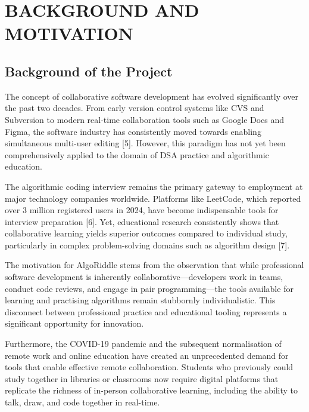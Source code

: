 \chapter{BACKGROUND AND MOTIVATION}

\section{Background of the Project}

The concept of collaborative software development has evolved significantly over the past two decades. From early version control systems like CVS and Subversion to modern real-time collaboration tools such as Google Docs and Figma, the software industry has consistently moved towards enabling simultaneous multi-user editing [5]. However, this paradigm has not yet been comprehensively applied to the domain of DSA practice and algorithmic education.

The algorithmic coding interview remains the primary gateway to employment at major technology companies worldwide. Platforms like LeetCode, which reported over 3 million registered users in 2024, have become indispensable tools for interview preparation [6]. Yet, educational research consistently shows that collaborative learning yields superior outcomes compared to individual study, particularly in complex problem-solving domains such as algorithm design [7].

The motivation for AlgoRiddle stems from the observation that while professional software development is inherently collaborative---developers work in teams, conduct code reviews, and engage in pair programming---the tools available for learning and practising algorithms remain stubbornly individualistic. This disconnect between professional practice and educational tooling represents a significant opportunity for innovation.

Furthermore, the COVID-19 pandemic and the subsequent normalisation of remote work and online education have created an unprecedented demand for tools that enable effective remote collaboration. Students who previously could study together in libraries or classrooms now require digital platforms that replicate the richness of in-person collaborative learning, including the ability to talk, draw, and code together in real-time.

